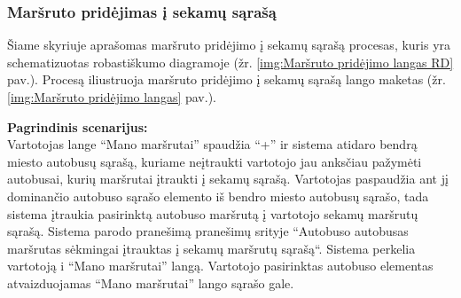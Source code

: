\documentclass{VUMIFPSkursinis}
\begin{document}
\subsubsection{Maršruto pridėjimas į sekamų sąrašą}
	Šiame skyriuje aprašomas maršruto pridėjimo į sekamų sąrašą procesas, kuris yra schematizuotas robastiškumo diagramoje (žr. \ref{img:Maršruto pridėjimo langas RD} pav.). 
	Procesą iliustruoja maršruto pridėjimo į sekamų sąrašą lango maketas (žr. \ref{img:Maršruto pridėjimo langas} pav.).
	
	\textbf{Pagrindinis scenarijus:}\\
	Vartotojas lange “Mano maršrutai” spaudžia “+” ir sistema atidaro bendrą miesto autobusų sąrašą, kuriame neįtraukti 
	vartotojo jau anksčiau pažymėti autobusai, kurių maršrutai įtraukti į sekamų sąrašą. Vartotojas paspaudžia ant jį 
	dominančio autobuso sąrašo elemento iš bendro miesto autobusų sąrašo, tada sistema įtraukia pasirinktą autobuso maršrutą 
	į vartotojo sekamų maršrutų sąrašą. Sistema parodo pranešimą pranešimų srityje “Autobuso {autobusas} maršrutas sėkmingai 
	įtrauktas į sekamų maršrutų sąrašą“. Sistema perkelia vartotoją i “Mano maršrutai” langą. Vartotojo pasirinktas autobuso 
	elementas atvaizduojamas “Mano maršrutai” lango sąrašo gale.
\end{document}
